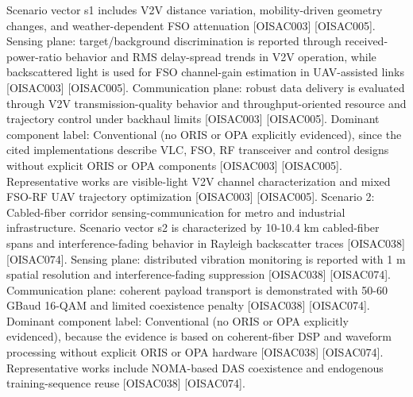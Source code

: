 {}Scenario vector s1 includes V2V distance variation, mobility-driven geometry changes, and weather-dependent FSO attenuation [O\markdownRendererUnderscore{}ISAC\markdownRendererUnderscore{}003] [O\markdownRendererUnderscore{}ISAC\markdownRendererUnderscore{}005]. Sensing plane: target/background discrimination is reported through received-power-ratio behavior and RMS delay-spread trends in V2V operation, while backscattered light is used for FSO channel-gain estimation in UAV-assisted links [O\markdownRendererUnderscore{}ISAC\markdownRendererUnderscore{}003] [O\markdownRendererUnderscore{}ISAC\markdownRendererUnderscore{}005]. Communication plane: robust data delivery is evaluated through V2V transmission-quality behavior and throughput-oriented resource and trajectory control under backhaul limits [O\markdownRendererUnderscore{}ISAC\markdownRendererUnderscore{}003] [O\markdownRendererUnderscore{}ISAC\markdownRendererUnderscore{}005]. Dominant component label: Conventional (no ORIS or OPA explicitly evidenced), since the cited implementations describe VLC, FSO, RF transceiver and control designs without explicit ORIS or OPA components [O\markdownRendererUnderscore{}ISAC\markdownRendererUnderscore{}003] [O\markdownRendererUnderscore{}ISAC\markdownRendererUnderscore{}005]. Representative works are visible-light V2V channel characterization and mixed FSO-RF UAV trajectory optimization [O\markdownRendererUnderscore{}ISAC\markdownRendererUnderscore{}003] [O\markdownRendererUnderscore{}ISAC\markdownRendererUnderscore{}005].\markdownRendererParagraphSeparator
{}Scenario 2: Cabled-fiber corridor sensing-communication for metro and industrial infrastructure.\markdownRendererHardLineBreak
{}Scenario vector s2 is characterized by 10-10.4 km cabled-fiber spans and interference-fading behavior in Rayleigh backscatter traces [O\markdownRendererUnderscore{}ISAC\markdownRendererUnderscore{}038] [O\markdownRendererUnderscore{}ISAC\markdownRendererUnderscore{}074]. Sensing plane: distributed vibration monitoring is reported with 1 m spatial resolution and interference-fading suppression [O\markdownRendererUnderscore{}ISAC\markdownRendererUnderscore{}038] [O\markdownRendererUnderscore{}ISAC\markdownRendererUnderscore{}074]. Communication plane: coherent payload transport is demonstrated with 50-60 GBaud 16-QAM and limited coexistence penalty [O\markdownRendererUnderscore{}ISAC\markdownRendererUnderscore{}038] [O\markdownRendererUnderscore{}ISAC\markdownRendererUnderscore{}074]. Dominant component label: Conventional (no ORIS or OPA explicitly evidenced), because the evidence is based on coherent-fiber DSP and waveform processing without explicit ORIS or OPA hardware [O\markdownRendererUnderscore{}ISAC\markdownRendererUnderscore{}038] [O\markdownRendererUnderscore{}ISAC\markdownRendererUnderscore{}074]. Representative works include NOMA-based DAS coexistence and endogenous training-sequence reuse [O\markdownRendererUnderscore{}ISAC\markdownRendererUnderscore{}038] [O\markdownRendererUnderscore{}ISAC\markdownRendererUnderscore{}074].\markdownRendererParagraphSeparator
